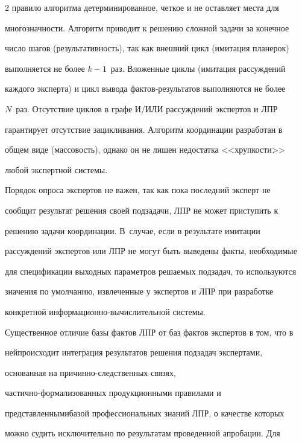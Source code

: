 \begin{multicols}{2}
правило алгоритма детерминированное, четкое и не оставляет места для 


многозначности. Алгоритм приводит к решению сложной задачи за конечное 


число шагов (результативность), так как внешний цикл (имитация планерок) 


выполняется не более $k - 1$~раз. Вложенные циклы (имитация рассуждений 


каждого эксперта) и цикл вывода фактов-результатов выполняются не более 


$N$~раз. Отсутствие циклов в графе И/ИЛИ рассуждений экспертов и ЛПР 


гарантирует отсутствие зацикливания. Алгоритм координации разработан в 


общем виде (массовость), однако он не лишен недостатка <<хрупкости>> 


любой экспертной системы.


  


  Порядок опроса экспертов не важен, так как пока последний эксперт не 


сообщит результат решения своей подзадачи, ЛПР не может приступить к 


решению задачи координации.  В~случае, если в результате имитации 


рассуждений экспертов или ЛПР не могут быть выведены факты, необходимые 


для спецификации выходных параметров решаемых подзадач, то используются 


значения по умолчанию, извлеченные у экспертов и ЛПР при  разработке 


конкретной ин\-фор\-ма\-ци\-он\-но-вы\-чис\-ли\-тель\-ной сис\-те\-мы. 


Существенное отличие базы фактов ЛПР от баз фактов экспертов в том, что в 


ней\linebreak происходит интеграция результатов решения подзадач экспертами, 


основанная на при\-чин\-но-след\-ст\-вен\-ных связях, 


  час\-тич\-но-фор\-ма\-ли\-зо\-ван\-ных продукционными правилами и 


представленными\linebreak базой профессиональных знаний ЛПР, о качестве которых 


можно судить исключительно по результатам проведенной апробации. Для 



\end{multicols}
